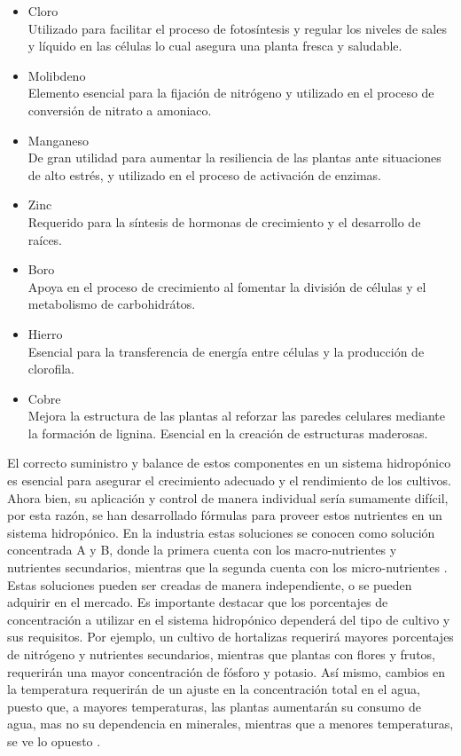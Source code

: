 \begin{itemize}
	\item Cloro\\
	Utilizado para facilitar el proceso de fotosíntesis y regular los niveles de sales y líquido en las células lo cual asegura una planta fresca y saludable.
	\item Molibdeno\\
	Elemento esencial para la fijación de nitrógeno y utilizado en el proceso de conversión de nitrato a amoniaco.
	\item Manganeso\\
	De gran utilidad para aumentar la resiliencia de las plantas ante situaciones de alto estrés, y utilizado en el proceso de activación de enzimas.
	\item Zinc\\
	Requerido para la síntesis de hormonas de crecimiento y el desarrollo de raíces.
	\item Boro\\
	Apoya en el proceso de crecimiento al fomentar la división de células y el metabolismo de carbohidrátos.
	\item Hierro\\
	Esencial para la transferencia de energía entre células y la producción de clorofila.
	\item Cobre\\
	Mejora la estructura de las plantas al reforzar las paredes celulares mediante la formación de lignina. Esencial en la creación de estructuras maderosas.
\end{itemize}

El correcto suministro y balance de estos componentes en un sistema hidropónico es esencial para asegurar el crecimiento adecuado y el rendimiento de los cultivos. Ahora bien, su aplicación y control de manera individual sería sumamente difícil, por esta razón, se han desarrollado fórmulas para proveer estos nutrientes en un sistema hidropónico. En la industria estas soluciones se conocen como solución concentrada A y B, donde la primera cuenta con los macro-nutrientes y nutrientes secundarios, mientras que la segunda cuenta con los micro-nutrientes \cite{marulanda_huerta_2003}. Estas soluciones pueden ser creadas de manera independiente, o se pueden adquirir en el mercado. Es importante destacar que los porcentajes de concentración a utilizar en el sistema hidropónico dependerá del tipo de cultivo y sus requisitos. Por ejemplo, un cultivo de hortalizas requerirá mayores porcentajes de nitrógeno y nutrientes secundarios, mientras que plantas con flores y frutos, requerirán una mayor concentración de fósforo y potasio. Así mismo, cambios en la temperatura requerirán de un ajuste en la concentración total en el agua, puesto que, a mayores temperaturas, las plantas aumentarán su consumo de agua, mas no su dependencia en minerales, mientras que a menores temperaturas, se ve lo opuesto \cite{marulanda_huerta_2003}.

